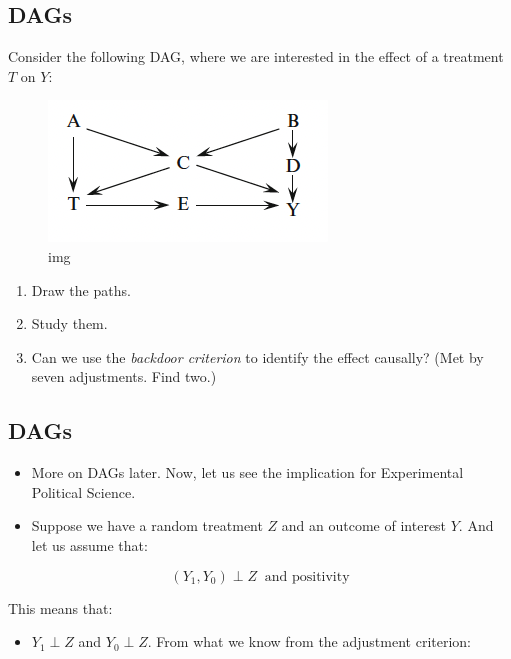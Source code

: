 \documentclass[11pt]{article}
\providecommand{\tightlist}{%
      \setlength{\itemsep}{0pt}\setlength{\parskip}{0pt}}
\begin{document}
    \hypertarget{dags}{%
\subsection{DAGs}\label{dags}}

Consider the following DAG, where we are interested in the effect of a
treatment \(T\) on \(Y\):

\begin{figure}
\centering
\includegraphics{../img/dag7.png}
\caption{img}
\end{figure}

\begin{enumerate}
\def\labelenumi{\arabic{enumi}.}
\tightlist
\item
  Draw the paths.
\item
  Study them.
\item
  Can we use the \emph{backdoor criterion} to identify the effect
  causally? (Met by seven adjustments. Find two.)
\end{enumerate}

    \hypertarget{dags}{%
\subsection{DAGs}\label{dags}}

\begin{itemize}
\item
  More on DAGs later. Now, let us see the implication for Experimental
  Political Science.
\item
  Suppose we have a random treatment \(Z\) and an outcome of interest
  \(Y\). And let us assume that:
\end{itemize}

\[ (Y_{1}, Y_{0}) \perp Z \ \text{ and positivity}\]

This means that:

\begin{itemize}
\tightlist
\item
  \(Y_1 \perp Z\) and \(Y_0 \perp Z\). From what we know from the
  adjustment criterion:
\end{itemize}
\end{document}
